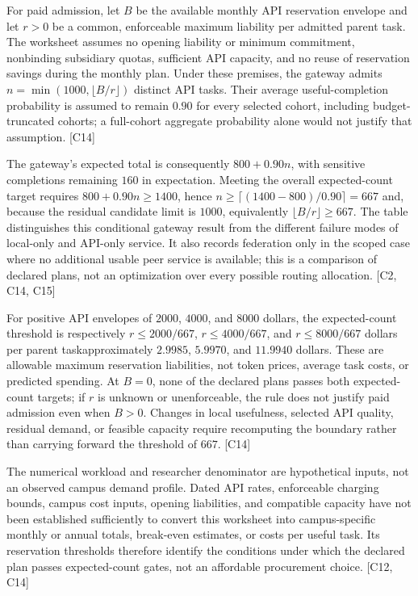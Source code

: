 \documentclass[11pt]{article}
\begin{document}
For paid admission, let $B$ be the available monthly API reservation envelope and let $r>0$ be a common, enforceable maximum liability per admitted parent task. The worksheet assumes no opening liability or minimum commitment, nonbinding subsidiary quotas, sufficient API capacity, and no reuse of reservation savings during the monthly plan. Under these premises, the gateway admits $n=\min(1000,\lfloor B/r\rfloor)$ distinct API tasks. Their average useful-completion probability is assumed to remain $0.90$ for every selected cohort, including budget-truncated cohorts; a full-cohort aggregate probability alone would not justify that assumption. [C14]

The gateway's expected total is consequently $800+0.90n$, with sensitive completions remaining $160$ in expectation. Meeting the overall expected-count target requires $800+0.90n\geq1400$, hence $n\geq\lceil(1400-800)/0.90\rceil=667$ and, because the residual candidate limit is $1000$, equivalently $\lfloor B/r\rfloor\geq667$. The table distinguishes this conditional gateway result from the different failure modes of local-only and API-only service. It also records federation only in the scoped case where no additional usable peer service is available; this is a comparison of declared plans, not an optimization over every possible routing allocation. [C2, C14, C15]

For positive API envelopes of $2000$, $4000$, and $8000$ dollars, the expected-count threshold is respectively $r\leq2000/667$, $r\leq4000/667$, and $r\leq8000/667$ dollars per parent task\textemdash{}approximately $2.9985$, $5.9970$, and $11.9940$ dollars. These are allowable maximum reservation liabilities, not token prices, average task costs, or predicted spending. At $B=0$, none of the declared plans passes both expected-count targets; if $r$ is unknown or unenforceable, the rule does not justify paid admission even when $B>0$. Changes in local usefulness, selected API quality, residual demand, or feasible capacity require recomputing the boundary rather than carrying forward the threshold of $667$. [C14]

The numerical workload and researcher denominator are hypothetical inputs, not an observed campus demand profile. Dated API rates, enforceable charging bounds, campus cost inputs, opening liabilities, and compatible capacity have not been established sufficiently to convert this worksheet into campus-specific monthly or annual totals, break-even estimates, or costs per useful task. Its reservation thresholds therefore identify the conditions under which the declared plan passes expected-count gates, not an affordable procurement choice. [C12, C14]
\end{document}

